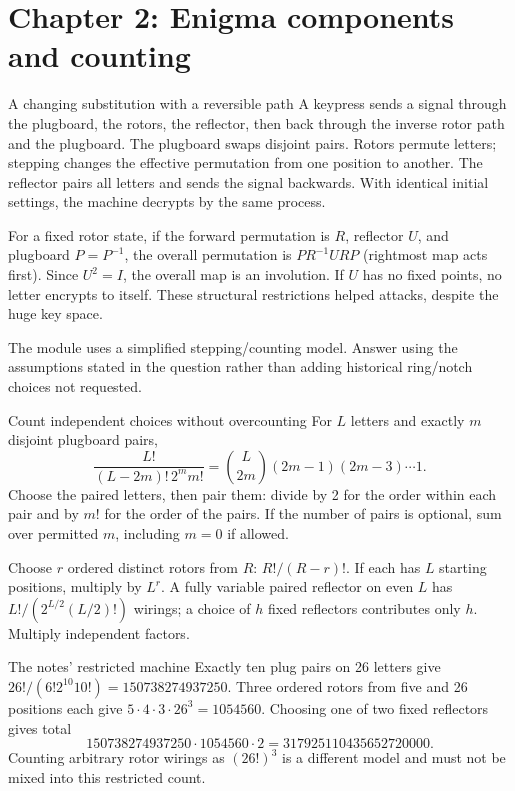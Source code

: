 \documentclass[11pt,a4paper]{article}
\begin{document}
\section{Chapter 2: Enigma components and counting}
\begin{concept}{A changing substitution with a reversible path}
A keypress sends a signal through the plugboard, the rotors, the reflector, then back through the inverse rotor path and the plugboard. The plugboard swaps disjoint pairs. Rotors permute letters; stepping changes the effective permutation from one position to another. The reflector pairs all letters and sends the signal backwards. With identical initial settings, the machine decrypts by the same process.

For a fixed rotor state, if the forward permutation is \(R\), reflector \(U\), and plugboard \(P=P^{-1}\), the overall permutation is \(P R^{-1}URP\) (rightmost map acts first). Since \(U^2=I\), the overall map is an involution. If \(U\) has no fixed points, no letter encrypts to itself. These structural restrictions helped attacks, despite the huge key space.

The module uses a simplified stepping/counting model. Answer using the assumptions stated in the question rather than adding historical ring/notch choices not requested.
\end{concept}
\begin{method}{Count independent choices without overcounting}
For \(L\) letters and exactly \(m\) disjoint plugboard pairs,
\[\boxed{\frac{L!}{(L-2m)!\,2^m m!}=\binom L{2m}(2m-1)(2m-3)\cdots1.}\]
Choose the paired letters, then pair them: divide by 2 for the order within each pair and by \(m!\) for the order of the pairs. If the number of pairs is optional, sum over permitted \(m\), including \(m=0\) if allowed.

Choose \(r\) ordered distinct rotors from \(R\): \(R!/(R-r)!\). If each has \(L\) starting positions, multiply by \(L^r\). A fully variable paired reflector on even \(L\) has \(L!/(2^{L/2}(L/2)!)\) wirings; a choice of \(h\) fixed reflectors contributes only \(h\). Multiply independent factors.
\end{method}
\begin{example}{The notes' restricted machine}
Exactly ten plug pairs on 26 letters give \(26!/(6!2^{10}10!)=150738274937250\). Three ordered rotors from five and 26 positions each give \(5\cdot4\cdot3\cdot26^3=1054560\). Choosing one of two fixed reflectors gives total
\[150738274937250\cdot1054560\cdot2=317925110435652720000.\]
Counting arbitrary rotor wirings as \((26!)^3\) is a different model and must not be mixed into this restricted count.
\end{example}
\end{document}
